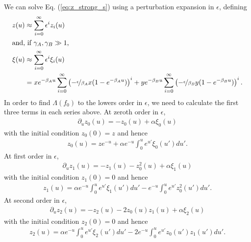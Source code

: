 \documentclass[11pt]{article}
\begin{document}
We can solve Eq. (\ref{eq:z_strong_s}) using a perturbation expansion in $\epsilon$, defining 
\begin{subequations}\begin{align}
    z (u) &\approx \sum_{i=0}^\infty \epsilon^i z_i (u) \label{eq:z(u)_series}\\
    \intertext{and, if $\gamma_A,\gamma_B \gg 1$,}
    \xi (u) &\approx \sum_{i=0}^\infty \epsilon^i \xi_i (u) \\ \nonumber
    &= xe^{-\beta_A u} \sum_{i=0}^\infty \left(-\nicefrac{\epsilon}{\beta_A}x(1-e^{-\beta_A u})\right)^i
    + ye^{-\beta_B u} \sum_{i=0}^\infty \left(-\nicefrac{\epsilon}{\beta_B}y(1-e^{-\beta_B u})\right)^i
    .\label{eq:f(u)_series}
\end{align}\end{subequations}
In order to find $\Lambda(f_0)$ to the lowers order in $\epsilon$, we need to calculate the first three terms in each series above.
At zeroth order in $\epsilon$,
\begin{align}
    \partial_u z_0(u) = -z_0(u) + \alpha \xi_0(u)  
\end{align}
with the initial condition $z_0(0) = z$ and hence 
\begin{align}
    z_0(u) = ze^{-u} + \alpha e^{-u} \int_0^u e^{u'} \xi_0(u') du'.
\end{align}
At first order in $\epsilon$,
\begin{align}
    \partial_u z_1(u) = -z_1(u) -z_0^2(u) + \alpha \xi_1(u) 
\end{align}
with the initial condition $z_1(0) = 0$ and hence 
\begin{align}
    z_1(u) = \alpha e^{-u} \int_0^u e^{u'} \xi_1(u') du' - e^{-u} \int_0^u e^{u'} z_0^2 (u') du'.
\end{align}
At second order in $\epsilon$,
\begin{align}
    \partial_u z_2(u) = -z_2(u) -2z_0(u)z_1(u) + \alpha \xi_2(u) 
\end{align}
with the initial condition $z_2(0) = 0$ and hence 
\begin{align}
    z_2(u) = \alpha e^{-u} \int_0^u e^{u'} \xi_2(u') du' - 2e^{-u} \int_0^u e^{u'} z_0(u')z_1(u') du'.
\end{align}
\end{document}
